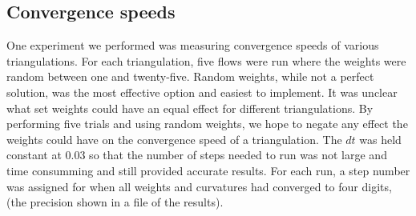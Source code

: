 \documentclass[12pt]{article}
\begin{document}
\subsection{Convergence speeds}

One experiment we performed was measuring convergence speeds of various triangulations. For each triangulation, five flows were run where the weights were random between one and twenty-five. Random weights, while not a perfect solution, was the most effective option and easiest to implement. It was unclear what set weights could have an equal effect for different triangulations. By performing five trials and using random weights, we hope to negate any effect the weights could have on the convergence speed of a triangulation. The $dt$ was held constant at 0.03 so that the number of steps needed to run was not large and time consumming and still provided accurate results. For each run, a step number was assigned for when all weights and curvatures had converged to four digits, (the precision shown in a file of the results).\newline
\end{document}
